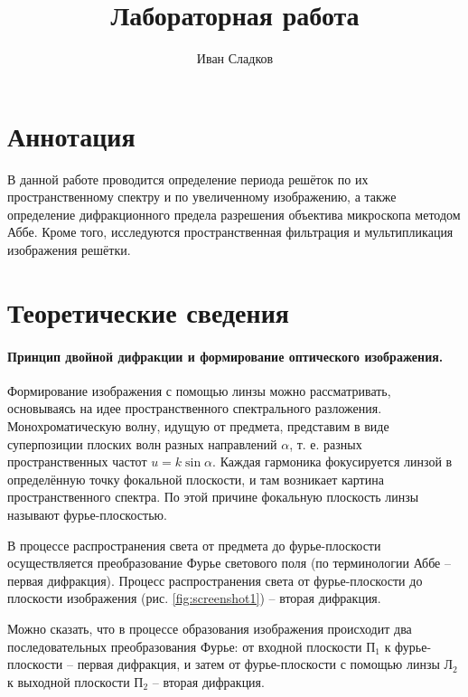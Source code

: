 \documentclass[a4paper]{article}
\title{Лабораторная работа \labnum \space \labname}
\author{Иван Сладков}
\begin{document}
\maketitle
\thispagestyle{empty}
\section{Аннотация}

В данной работе проводится определение периода решёток по их пространственному спектру и по увеличенному изображению, а также определение дифракционного предела разрешения объектива микроскопа методом Аббе. Кроме того, исследуются пространственная фильтрация и мультипликация изображения решётки.

\section{Теоретические сведения}

\paragraph{Принцип двойной дифракции и формирование оптического	изображения.}

Формирование изображения с помощью линзы можно рассматривать, основываясь на идее пространственного спектрального разложения. Монохроматическую волну, идущую от предмета, представим в виде суперпозиции плоских волн разных направлений $ \alpha $, т. е. разных пространственных частот $ u = k \sin \alpha $. Каждая гармоника фокусируется линзой в определённую точку фокальной плоскости, и там возникает картина пространственного спектра. По этой причине фокальную плоскость линзы называют фурье-плоскостью.

В процессе распространения света от предмета до фурье-плоскости осуществляется преобразование Фурье светового поля (по терминологии Аббе -- первая дифракция). Процесс распространения света от фурье-плоскости до плоскости изображения (рис. \ref{fig:screenshot1}) -- вторая дифракция.

Можно сказать, что в процессе образования изображения происходит два последовательных преобразования Фурье: от входной плоскости $ П_1 $ к фурье-плоскости -- первая дифракция, и затем от фурье-плоскости с помощью линзы $ Л_2 $ к выходной плоскости $ П_2 $ -- вторая дифракция.
\end{document}
